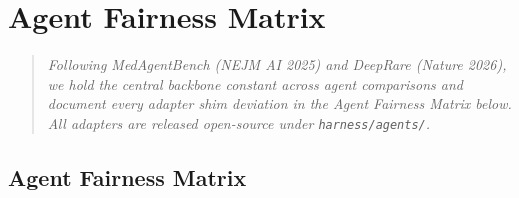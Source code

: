 \section{Agent Fairness Matrix}\label{sec-5-1}

\begin{quote}
\emph{Following MedAgentBench (NEJM AI 2025) and DeepRare (Nature 2026), we hold the central backbone constant across agent comparisons and document every adapter shim deviation in the Agent Fairness Matrix below. All adapters are released open-source under \texttt{harness/agents/}.}
\end{quote}

\subsection{Agent Fairness Matrix}\label{agent-fairness-matrix}

